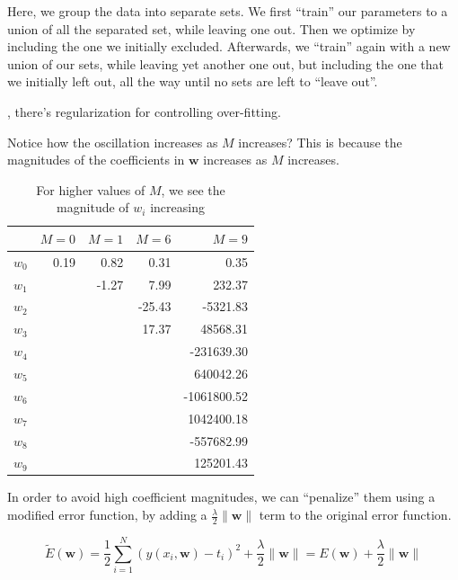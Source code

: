 \documentclass{tufte-handout}
\begin{document}
Here, we group the data into separate sets. We first ``train'' our parameters to
a union of all the separated set, while leaving one out. Then we optimize by
including the one we initially excluded. Afterwards, we ``train'' again with a
new union of our sets, while leaving yet another one out, but including the one
that we initially left out, all the way until no sets are left to ``leave out''.

, there's regularization for controlling over-fitting.

Notice how the oscillation increases as $M$ increases? This is because the
magnitudes of the coefficients in $\mathbf{w}$ increases as $M$ increases.

\begin{table}[h]
  \begin{center}
    \begin{tabular}{lrrrr}
      \toprule
       & $M = 0$ & $M = 1$ & $M = 6$ & $M = 9$ \\
      \midrule
      $w_0$ & 0.19 &  0.82 &   0.31 &        0.35 \\
      $w_1$ &      & -1.27 &   7.99 &      232.37 \\
      $w_2$ &      &       & -25.43 &    -5321.83 \\
      $w_3$ &      &       &  17.37 &    48568.31 \\
      $w_4$ &      &       &        &  -231639.30 \\
      $w_5$ &      &       &        &   640042.26 \\
      $w_6$ &      &       &        & -1061800.52 \\
      $w_7$ &      &       &        &  1042400.18 \\
      $w_8$ &      &       &        &  -557682.99 \\
      $w_9$ &      &       &        &   125201.43 \\
      \bottomrule
    \end{tabular}
  \end{center}
  \caption{For higher values of $M$, we see the magnitude of $w_i$ increasing}
  \label{tab:font-sizes}
\end{table}

In order to avoid high coefficient magnitudes, we can ``penalize'' them using
a modified error function, by adding a $\frac{\lambda}{2}\|\mathbf{w}\|$ term
to the original error function.

\begin{equation}
  \widetilde{E}(\mathbf{w}) =
    \frac{1}{2}\sum\limits_{i = 1}^N(y(x_i, \mathbf{w}) - t_i)^2
      + \frac{\lambda}{2}\|\mathbf{w}\|
    = E(\mathbf{w}) + \frac{\lambda}{2}\|\mathbf{w}\|
\end{equation}
\end{document}
